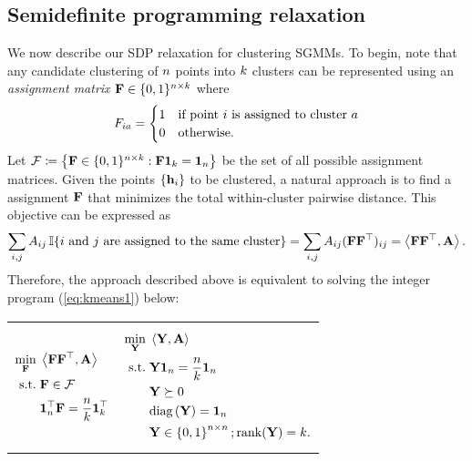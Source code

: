 \subsection{Semidefinite programming relaxation\label{sec:setup_sdp}}

We now describe our SDP relaxation for clustering SGMMs. To begin,
note that any candidate clustering of $n$ points into $k$
clusters can be represented using an \emph{assignment matrix $\mathbf{F}\in\{0,1\}^{n\times k}$
}where 
\[
F_{ia}=\begin{cases}
1 & \text{if point \ensuremath{i} is assigned to cluster \ensuremath{a}}\\
0 & \text{otherwise.}
\end{cases}
\]
Let $\mathcal{F}\coloneqq\left\{ \mathbf{F}\in\{0,1\}^{n\times k}:\mathbf{F}\mathbf{1}_{k}=\mathbf{1}_{n}\right\} $
be the set of all possible assignment matrices. Given the points $\{\mathbf{h}_{i}\}$
to be clustered, a natural approach is to find a assignment $\mathbf{F}$
that minimizes the total within-cluster pairwise distance. This objective
can be expressed as
\[
\sum_{i,j}A_{ij}\operatorname*{\mathbb{I}}\{\text{\ensuremath{i} and \ensuremath{j} are assigned to the same cluster}\}=\sum_{i,j}A_{ij}(\mathbf{F}\mathbf{F}^{\top})_{ij}=\left\langle \mathbf{F}\mathbf{F}^{\top},\mathbf{A}\right\rangle .
\]
Therefore, the approach described above is equivalent to solving the
integer program (\ref{eq:kmeans1}) below:
\begin{center}
\begin{tabular}{cc}
\begin{minipage}[t]{0.3\textwidth}%
\begin{equation}
\begin{aligned}\min_{\mathbf{F}}\; & \left\langle \mathbf{F}\mathbf{F}^{\top},\mathbf{A}\right\rangle \\
\text{s.t.}\; & \mathbf{F}\in\mathcal{F}\\
 & \mathbf{1}_{n}^{\top}\mathbf{F}=\frac{n}{k}\mathbf{1}_{k}^{\top}
\end{aligned}
\label{eq:kmeans1}
\end{equation}
%
\end{minipage} & %
\begin{minipage}[t]{0.5\textwidth}%
\begin{equation}
\begin{aligned}\min_{\mathbf{Y}}\; & \left\langle \mathbf{Y},\mathbf{A}\right\rangle \\
\text{s.t.}\; & \mathbf{Y}\mathbf{1}_{n}=\frac{n}{k}\mathbf{1}_{n}\\
 & \mathbf{Y}\succeq0\\
 & \mbox{diag}\left(\mathbf{Y}\right)=\mathbf{1}_{n}\\
 & \mathbf{Y}\in\left\{ 0,1\right\} ^{n\times n};\operatorname*{rank}(\mathbf{Y})=k.
\end{aligned}
\label{eq:kmeans2}
\end{equation}
%
\end{minipage}\tabularnewline
\end{tabular}
\par\end{center}

